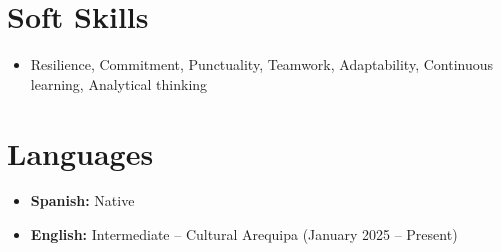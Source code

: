 \documentclass[11pt,a4paper,sans]{moderncv}
\begin{document}
\section{Soft Skills}
{\begin{itemize}[label=\textbullet]
\item Resilience, Commitment, Punctuality, Teamwork, Adaptability, Continuous learning, Analytical thinking
\end{itemize}}

\section{Languages}
\begin{itemize}[label=\textbullet]
    \item {\textbf{Spanish:} Native}
    \item {\textbf{English:} Intermediate – Cultural Arequipa (January 2025 – Present)}
\end{itemize}
\end{document}
